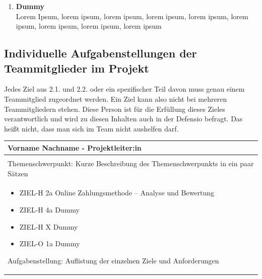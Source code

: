 \documentclass[
	headings=optiontotocandhead,%
	oneside,
	numbers=noenddot,%
	toc=flat, %
	10pt, %
	parskip=full, %
	listof=totoc, %
	listof=flat, %
	numbers=noenddot, %
	bibliography=totoc, %
	a4paper,DIV=14,
]{scrartcl}
\begin{document}
\begin{enumerate}[start=1,label={\bfseries Ziel-N \arabic*},leftmargin=*,wide]
\item{\bfseries{Dummy}}\\
Lorem Ipsum, lorem ipsum, lorem ipsum, lorem ipsum, lorem ipsum, lorem ipsum, lorem ipsum, lorem ipsum, lorem ipsum
\end{enumerate}
\newpage

\subsection{Individuelle Aufgabenstellungen der Teammitglieder im Projekt}
Jedes Ziel aus 2.1. und 2.2. oder ein spezifischer Teil davon muss genau einem Teammitglied zugeordnet werden. Ein Ziel kann also nicht bei mehreren Teammitgliedern stehen. Diese Person ist für die Erfüllung dieses Zieles verantwortlich und wird zu diesen Inhalten auch in der Defensio befragt. Das heißt nicht, dass man sich im Team nicht aushelfen darf.

\begin{table}[H]
	\begin{tabularx} {\textwidth} {
			|>{\hsize=1\hsize}X|
		}
		
		\hline
		\rowcolor[HTML]{D9D9D9} 
		\rule{0pt}{15pt}
		\textbf{\normalsize{Vorname Nachname - Projektleiter:in}} \\ \hline
		
		\rule{0pt}{20pt} \\
		\rule{0pt}{11pt}\textcolor[HTML]{A6A6A6}{\footnotesize{Themenschwerpunkt: Kurze Beschreibung des Themenschwerpunkts in ein paar Sätzen}} \\ \hline
		
		\begin{itemize}[itemsep=0pt, parsep=0pt, topsep=0pt]
			\item{ZIEL-H 2a Online Zahlungsmethode – Analyse und Bewertung}
			\item{ZIEL-H 4a Dummy}
			\item{ZIEL-H X Dummy}
			\item{ZIEL-O 1a Dummy}
		\end{itemize}
		
		\rule{0pt}{11pt}\textcolor[HTML]{A6A6A6}{\footnotesize{Aufgabenstellung: Auflistung der einzelnen Ziele und Anforderungen}} \\ \hline
	\end{tabularx}
\end{table}
\end{document}
